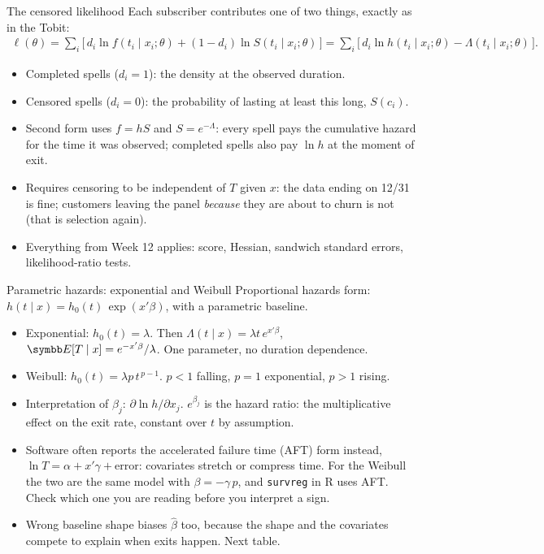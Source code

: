 \documentclass[aspectratio=169,11pt]{beamer}
\begin{document}
\begin{frame}{The censored likelihood}
Each subscriber contributes one of two things, exactly as in the Tobit:
\begin{align*}
	\ell(\theta) = \sum_i \Big[\, d_i \ln f(t_i \mid x_i; \theta) + (1 - d_i) \ln S(t_i \mid x_i; \theta) \,\Big]
	= \sum_i \Big[\, d_i \ln h(t_i \mid x_i; \theta) - \Lambda(t_i \mid x_i; \theta) \,\Big] .
\end{align*}
\begin{itemize}
	\item Completed spells ($d_i = 1$): the \alert{density} at the observed duration.
	\item Censored spells ($d_i = 0$): the \alert{probability} of lasting at least this long, $S(c_i)$.
	\medskip
	\item Second form uses $f = h S$ and $S = e^{-\Lambda}$: every spell pays the cumulative hazard for
	the time it was observed; completed spells also pay $\ln h$ at the moment of exit.
	\medskip
	\item Requires censoring to be \alert{independent} of $T$ given $x$: the data ending on 12/31 is fine;
	customers leaving the panel \emph{because} they are about to churn is not (that is selection again).
	\medskip
	\item Everything from Week 12 applies: score, Hessian, sandwich standard errors, likelihood-ratio tests.
\end{itemize}
\end{frame}


\begin{frame}{Parametric hazards: exponential and Weibull}
Proportional hazards form: $h(t \mid x) = h_0(t)\,\exp(x'\beta)$, with a parametric baseline.
\begin{itemize}
	\item \alert{Exponential}: $h_0(t) = \lambda$. Then $\Lambda(t \mid x) = \lambda t\,e^{x'\beta}$,
	$\E[T \mid x] = e^{-x'\beta}/\lambda$. One parameter, no duration dependence.
	\medskip
	\item \alert{Weibull}: $h_0(t) = \lambda p\,t^{\,p-1}$. $p < 1$ falling, $p = 1$ exponential, $p > 1$ rising.
	\medskip
	\item Interpretation of $\beta_j$: $\partial \ln h / \partial x_j$. $e^{\beta_j}$ is the \alert{hazard ratio}:
	the multiplicative effect on the exit rate, constant over $t$ by assumption.
	\medskip
	\item Software often reports the \alert{accelerated failure time} (AFT) form instead,
	$\ln T = \alpha + x'\gamma + \text{error}$: covariates stretch or compress time. For the Weibull the
	two are the same model with $\beta = -\gamma\,p$, and \texttt{survreg} in R uses AFT. Check which one
	you are reading before you interpret a sign.
	\medskip
	\item Wrong baseline shape biases $\hat\beta$ too, because the shape and the covariates compete to
	explain when exits happen. Next table.
\end{itemize}
\end{frame}
\end{document}

